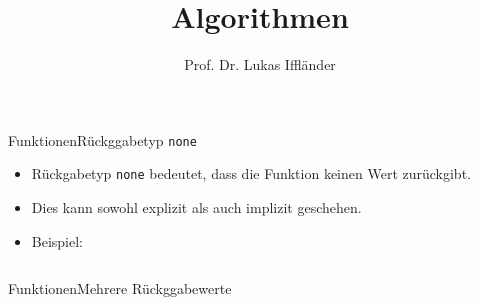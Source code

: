\documentclass[xelatex,aspectratio=169]{beamer}
\title{Algorithmen}
\author{Prof. Dr. Lukas Iffländer}
\institute{HTW Dresden}
\date{}
\begin{document}
\begin{frame}{Funktionen}{Rückggabetyp \texttt{none}}
    \begin{itemize}
        \item Rückgabetyp \texttt{none} bedeutet, dass die Funktion keinen Wert zurückgibt.
        \item Dies kann sowohl explizit als auch implizit geschehen.
        \item Beispiel:
              \inputminted{python}{src/functions_return_none.py}
    \end{itemize}
\end{frame}

\begin{frame}{Funktionen}{Mehrere Rückggabewerte}


\end{frame}
\end{document}
